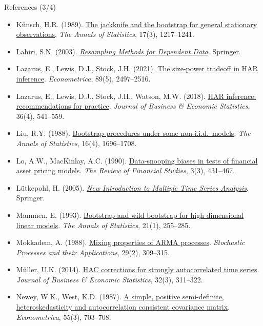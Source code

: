 \begin{frame}{References (3/4)}
\itemsize{\tiny}
\begin{itemize}
    \item Künsch, H.R. (1989). \href{https://doi.org/10.1214/aos/1176347265}{The jackknife and the bootstrap for general stationary observations}. \emph{The Annals of Statistics}, 17(3), 1217--1241.
    \item Lahiri, S.N. (2003). \href{https://doi.org/10.1007/978-1-4757-3803-2}{\emph{Resampling Methods for Dependent Data}}. Springer.
    \item Lazarus, E., Lewis, D.J., Stock, J.H. (2021). \href{https://doi.org/10.3982/ECTA15404}{The size-power tradeoff in HAR inference}. \emph{Econometrica}, 89(5), 2497--2516.
    \item Lazarus, E., Lewis, D.J., Stock, J.H., Watson, M.W. (2018). \href{https://doi.org/10.1080/07350015.2018.1506926}{HAR inference: recommendations for practice}. \emph{Journal of Business \& Economic Statistics}, 36(4), 541--559.
    \item Liu, R.Y. (1988). \href{https://doi.org/10.1214/aos/1176351062}{Bootstrap procedures under some non-i.i.d.\ models}. \emph{The Annals of Statistics}, 16(4), 1696--1708.
    \item Lo, A.W., MacKinlay, A.C. (1990). \href{https://doi.org/10.1093/rfs/3.3.431}{Data-snooping biases in tests of financial asset pricing models}. \emph{The Review of Financial Studies}, 3(3), 431--467.
    \item Lütkepohl, H. (2005). \href{https://doi.org/10.1007/978-3-540-27752-1}{\emph{New Introduction to Multiple Time Series Analysis}}. Springer.
    \item Mammen, E. (1993). \href{https://doi.org/10.1214/aos/1176349025}{Bootstrap and wild bootstrap for high dimensional linear models}. \emph{The Annals of Statistics}, 21(1), 255--285.
    \item Mokkadem, A. (1988). \href{https://doi.org/10.1016/0304-4149(88)90045-2}{Mixing properties of ARMA processes}. \emph{Stochastic Processes and their Applications}, 29(2), 309--315.
    \item Müller, U.K. (2014). \href{https://doi.org/10.1080/07350015.2014.931238}{HAC corrections for strongly autocorrelated time series}. \emph{Journal of Business \& Economic Statistics}, 32(3), 311--322.
    \item Newey, W.K., West, K.D. (1987). \href{https://doi.org/10.2307/1913610}{A simple, positive semi-definite, heteroskedasticity and autocorrelation consistent covariance matrix}. \emph{Econometrica}, 55(3), 703--708.

\end{itemize}
\end{frame}
